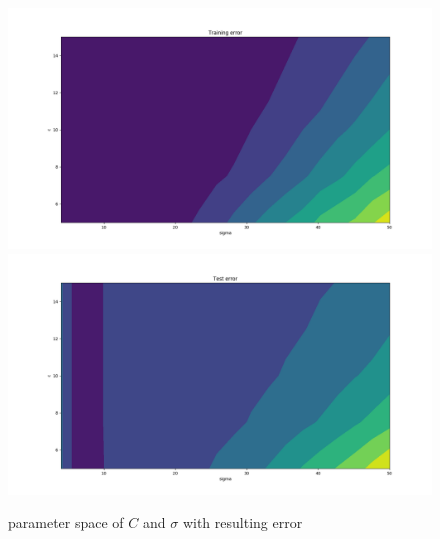 \begin{figure}[!h]
\begin{center}
\centering
\includegraphics[width=1\textwidth]{figures/new/3_Figure_6}
\includegraphics[width=1\textwidth]{figures/new/3_Figure_5}
\end{center}
\caption{\label{fig:3_4}  parameter space of $C$ and $\sigma$  with resulting error  }
\end{figure}





